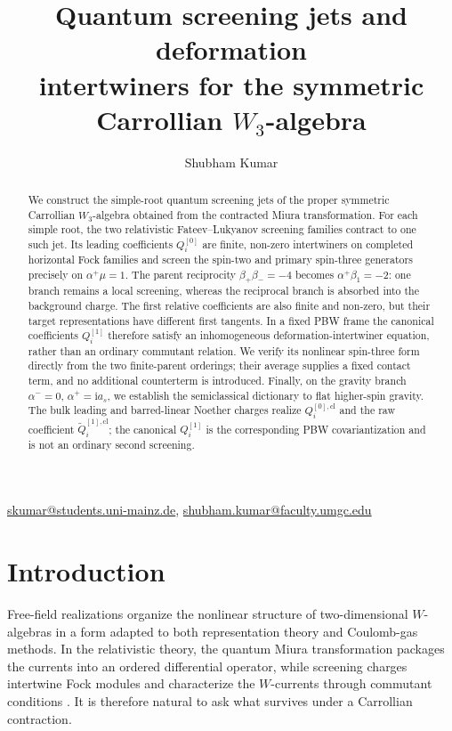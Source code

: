 \documentclass[11pt,a4paper]{article}
\title{\bfseries Quantum screening jets and deformation\\[1mm]
intertwiners for the symmetric\\[1mm]
Carrollian $W_3$-algebra}
\author[1,2]{Shubham Kumar}
\affil[1]{Institut f\"ur Physik, Mathematische Physik, Johannes Gutenberg-Universit\"at Mainz,
Staudingerweg 7, 55128 Mainz, Germany}
\affil[2]{University of Maryland Global Campus Europe, Wiesbaden, Germany}
\date{}
\numberwithin{equation}{section}
\theoremstyle{remark}
\newcommand{\cl}{\mathrm{cl}}
\newcommand{\ii}{\mathrm{i}}
\begin{document}
\maketitle
\vspace{-1.5em}
\begin{center}
\small\href{mailto:skumar@students.uni-mainz.de}{skumar@students.uni-mainz.de},
\href{mailto:shubham.kumar@faculty.umgc.edu}{shubham.kumar@faculty.umgc.edu}
\end{center}

\begin{abstract}
We construct the simple-root quantum screening jets of the proper symmetric Carrollian
$W_3$-algebra obtained from the contracted Miura transformation.  For each simple root, the
two relativistic Fateev--Lukyanov screening families contract to one such jet.  Its leading coefficients
$Q_i^{[0]}$ are finite, non-zero intertwiners on completed horizontal Fock families and screen
the spin-two and primary spin-three generators precisely on $\alpha^+\mu=1$.  The parent
reciprocity $\beta_+\beta_-=-4$ becomes $\alpha^+\beta_1=-2$: one branch remains a local
screening, whereas the reciprocal branch is absorbed into the background charge.  The first
relative coefficients are also finite and non-zero, but their target representations have
different first tangents.  In a fixed PBW frame the canonical coefficients $Q_i^{[1]}$ therefore
satisfy an inhomogeneous deformation-intertwiner equation, rather than an ordinary commutant
relation.  We verify its nonlinear spin-three form directly from the two finite-parent
orderings; their average supplies a fixed contact term, and no additional counterterm is
introduced.  Finally, on the gravity branch $\alpha^-=0$, $\alpha^+=\ii a_s$, we establish the
semiclassical dictionary to flat higher-spin gravity.  The bulk leading and barred-linear
Noether charges realize $Q_i^{[0],\cl}$ and the raw coefficient
$\widetilde Q_i^{[1],\cl}$; the canonical $Q_i^{[1]}$ is the corresponding PBW
covariantization and is not an ordinary second screening.
\end{abstract}

\tableofcontents

\section{Introduction}
\label{sec:introduction}

Free-field realizations organize the nonlinear structure of two-dimensional $W$-algebras
\cite{Zamolodchikov} in
a form adapted to both representation theory and Coulomb-gas methods.  In the relativistic
theory, the quantum Miura transformation packages the currents into an ordered differential
operator, while screening charges intertwine Fock modules and characterize the $W$-currents
through commutant conditions \cite{DotsenkoFateev,FateevLukyanov,Felder,BouwknegtSchoutens,
FeiginFrenkel,LitvinovSpodyneiko,TsuchiyaKanie,BalogEtAl}.  It is therefore natural to ask
what survives under a Carrollian contraction.
\end{document}
